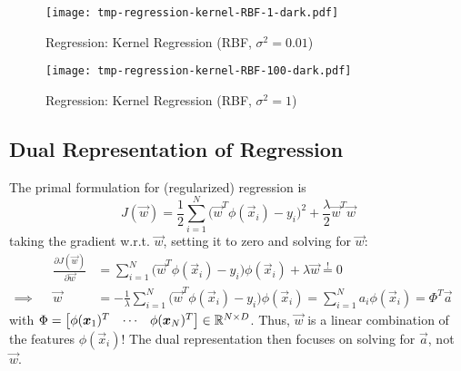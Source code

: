 			\begin{figure}
				\centering
				\texttt{[image: tmp-regression-kernel-RBF-1-dark.pdf]}
				\caption{Regression: Kernel Regression (RBF, \( \sigma^2 = 0.01 \))}
				\label{fig:regressionKernelA}
			\end{figure}
			\begin{figure}
				\centering
				\texttt{[image: tmp-regression-kernel-RBF-100-dark.pdf]}
				\caption{Regression: Kernel Regression (RBF, \( \sigma^2 = 1 \))}
				\label{fig:regressionKernelB}
			\end{figure}

		\subsection{Dual Representation of Regression}
			The primal formulation for (regularized) regression is
			\begin{equation}
				J(\vec{w}) = \frac{1}{2} \sum_{i = 1}^{N} \big( \vec{w}^T \phi(\vec{x}_i) - y_i \big)^2 + \frac{\lambda}{2} \vec{w}^T \vec{w}
			\end{equation}
			taking the gradient w.r.t. \( \vec{w} \), setting it to zero and solving for \(\vec{w}\):
			\begin{align}
				&& \frac{\partial J(\vec{w})}{\partial \vec{w}} &= \sum_{i = 1}^{N} \big(\vec{w}^T \phi(\vec{x}_i) - y_i\big) \phi(\vec{x}_i) + \lambda \vec{w} \overset{!}{=} 0 & \\
				\implies && \vec{w} &= -\frac{1}{\lambda} \sum_{i = 1}^{N} \big( \vec{w}^T \phi(\vec{x}_i) - y_i \big) \phi(\vec{x}_i) = \sum_{i = 1}^{N} a_i \phi(\vec{x}_i) = \Phi^T \vec{a}
			\end{align}
			with \( \Phi = \begin{bmatrix} \phi(\bm{x}_1)^T & \cdots & \phi(\bm{x}_N)^T \end{bmatrix} \in \mathbb{R}^{N \times D} \). Thus, \(\vec{w}\) is a linear combination of the features \(\phi(\vec{x}_i)\)! The dual representation then focuses on solving for \(\vec{a}\), not \(\vec{w}\).
			
